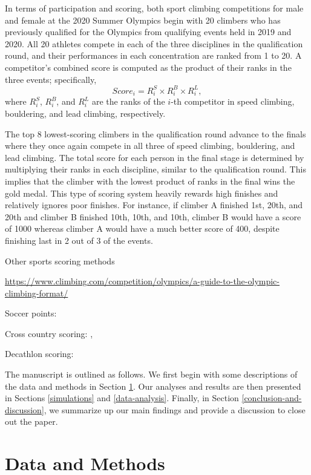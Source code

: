 \documentclass[12pt]{article}
\begin{document}
In terms of participation and scoring, both sport climbing competitions
for male and female at the 2020 Summer Olympics begin with 20 climbers
who has previously qualified for the Olympics from qualifying events
held in 2019 and 2020. All 20 athletes compete in each of the three
disciplines in the qualification round, and their performances in each
concentration are ranked from 1 to 20. A competitor's combined score is
computed as the product of their ranks in the three events;
specifically, \begin{equation}
Score_i = R^S_i\times R^B_i\times R^L_i,
\end{equation} where \(R^S_i\), \(R^B_i\), and \(R^L_i\) are the ranks
of the \(i\)-th competitor in speed climbing, bouldering, and lead
climbing, respectively.

The top 8 lowest-scoring climbers in the qualification round advance to
the finals where they once again compete in all three of speed climbing,
bouldering, and lead climbing. The total score for each person in the
final stage is determined by multiplying their ranks in each discipline,
similar to the qualification round. This implies that the climber with
the lowest product of ranks in the final wins the gold medal. This type
of scoring system heavily rewards high finishes and relatively ignores
poor finishes. For instance, if climber A finished 1st, 20th, and 20th
and climber B finished 10th, 10th, and 10th, climber B would have a
score of 1000 whereas climber A would have a much better score of 400,
despite finishing last in 2 out of 3 of the events.

Other sports scoring methods

\url{https://www.climbing.com/competition/olympics/a-guide-to-the-olympic-climbing-format/}

Soccer points: \citet{haugen2008}

Cross country scoring: \citet{hammond2007}, \citet{boudreau2018}

Decathlon scoring: \citet{westera2006}

The manuscript is outlined as follows. We first begin with some
descriptions of the data and methods in Section \ref{data-and-methods}.
Our analyses and results are then presented in Sections
\ref{simulations} and \ref{data-analysis}. Finally, in Section
\ref{conclusion-and-discussion}, we summarize up our main findings and
provide a discussion to close out the paper.

\hypertarget{data-and-methods}{%
\section{Data and Methods}\label{data-and-methods}}
\end{document}
